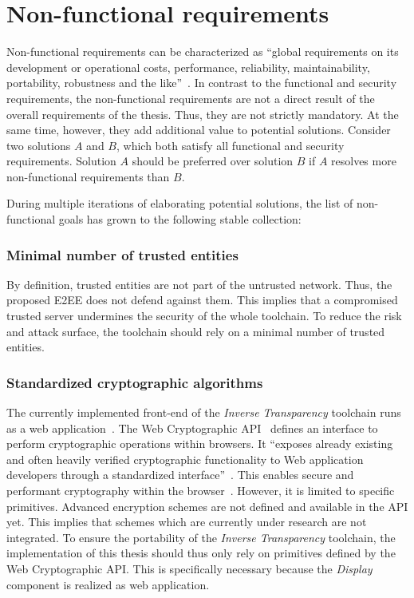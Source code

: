 \documentclass[../main.tex]{subfiles}
\begin{document}
\section{Non-functional requirements}\label{non-functional-requriements}
Non-functional requirements can be characterized as \enquote{global requirements on its development or operational costs, performance, reliability, maintainability, portability, robustness and the like}~\cite[11]{Mylopoulos1992}.
In contrast to the functional and security requirements, the non-functional requirements are not a direct result of the overall requirements of the thesis.
Thus, they are not strictly mandatory.
At the same time, however, they add additional value to potential solutions.
Consider two solutions $A$ and $B$, which both satisfy all functional and security requirements.
Solution $A$ should be preferred over solution $B$ if $A$ resolves more non-functional requirements than $B$.

During multiple iterations of elaborating potential solutions, the list of non-functional goals has grown to the following stable collection:

\subsubsection{Minimal number of trusted entities}
By definition, trusted entities are not part of the untrusted network. 
Thus, the proposed E2EE does not defend against them.
This implies that a compromised trusted server undermines the security of the whole toolchain.
To reduce the risk and attack surface, the toolchain should rely on a minimal number of trusted entities.

\subsubsection{Standardized cryptographic algorithms}
The currently implemented front-end of the \emph{Inverse Transparency} toolchain runs as a web application~\cite{Zieglmeier2021}. 
The Web Cryptographic API~\cite{WebCryptoApi2017} defines an interface to perform cryptographic operations within browsers. 
It \enquote{exposes already existing and often heavily verified cryptographic functionality to Web application developers through a standardized interface}~\cite[959]{Halpin2014}.
This enables secure and performant cryptography within the browser~\cite{Halpin2014}.
However, it is limited to specific primitives. 
Advanced encryption schemes are not defined and available in the API yet.
This implies that schemes which are currently under research are not integrated.
To ensure the portability of the \emph{Inverse Transparency} toolchain, the implementation of this thesis should thus only rely on primitives defined by the Web Cryptographic API.
This is specifically necessary because the \emph{Display} component is realized as web application.
\end{document}
